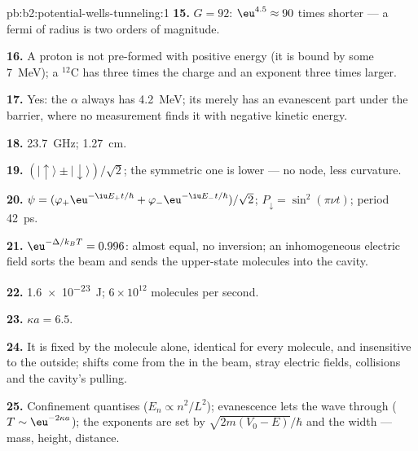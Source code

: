 \begin{solution}{pb:b2:potential-wells-tunneling:1}
\textbf{15.} $G = 92$: $\eu^{4.5} \approx 90$ times shorter --- a fermi of radius
is two orders of magnitude.

\textbf{16.} A proton is not pre-formed with positive energy (it is
bound by some \qty{7}{MeV}); a $^{12}$C has three times the charge and an
exponent three times larger.

\textbf{17.} Yes: the $\alpha$ always has \qty{4.2}{MeV}; its 
merely has an evanescent part under the barrier, where no measurement
finds it with negative kinetic energy.

\textbf{18.} \qty{23.7}{GHz}; \qty{1.27}{cm}.

\textbf{19.} $(|{\uparrow}\rangle \pm |{\downarrow}\rangle)/\sqrt2$; the
symmetric one is lower --- no node, less curvature.

\textbf{20.} $\psi = (\varphi_+\eu^{-\iu E_+t/\hbar} + \varphi_-\eu^{-\iu E_-t/\hbar})/\sqrt2$;
$P_{\downarrow} = \sin^2(\pi\nu t)$; period \qty{42}{ps}.

\textbf{21.} $\eu^{-\Delta/k_BT} = 0.996$: almost equal, no inversion; an
inhomogeneous electric field sorts the beam and sends the upper-state
molecules into the cavity.

\textbf{22.} \qty{1.6e-23}{J}; $6 \times 10^{12}$ molecules per second.

\textbf{23.} $\kappa a = 6.5$.

\textbf{24.} It is fixed by the molecule alone, identical for every
molecule, and insensitive to the outside; shifts come from the
 in the beam, stray electric fields, collisions and
the cavity's pulling.

\textbf{25.} Confinement quantises ($E_n \propto n^2/L^2$); evanescence lets
the wave through ($T \sim \eu^{-2\kappa a}$); the exponents are set by
$\sqrt{2m(V_0 - E)}/\hbar$ and the width --- mass, height, distance.
\end{solution}
